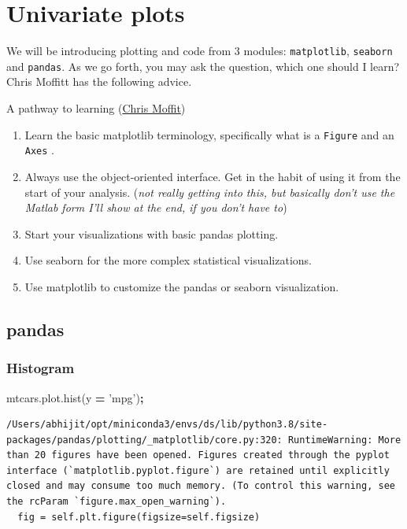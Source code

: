 \documentclass[
  letterpaper,
]{scrbook}
\newenvironment{Shaded}{\begin{snugshade}}{\end{snugshade}}
\newcommand{\NormalTok}[1]{#1}
\newcommand{\OperatorTok}[1]{\textcolor[rgb]{0.81,0.36,0.00}{\textbf{#1}}}
\newcommand{\StringTok}[1]{\textcolor[rgb]{0.31,0.60,0.02}{#1}}
\providecommand{\tightlist}{%
  \setlength{\itemsep}{0pt}\setlength{\parskip}{0pt}}
\begin{document}
\hypertarget{univariate-plots}{%
\section{Univariate plots}\label{univariate-plots}}

We will be introducing plotting and code from 3 modules: \texttt{matplotlib}, \texttt{seaborn} and \texttt{pandas}. As we go forth, you may ask the question, which one should I learn? Chris Moffitt has the following advice.

A pathway to learning (\href{https://pbpython.com/effective-matplotlib.html}{Chris Moffit})

\begin{enumerate}
\def\labelenumi{\arabic{enumi}.}
\tightlist
\item
  Learn the basic matplotlib terminology, specifically what is a \texttt{Figure} and an \texttt{Axes} .
\item
  Always use the object-oriented interface. Get in the habit of using it from the start of your analysis. (\emph{not really getting into this, but basically don't use the Matlab form I'll show at the end, if you don't have to})
\item
  Start your visualizations with basic pandas plotting.
\item
  Use seaborn for the more complex statistical visualizations.
\item
  Use matplotlib to customize the pandas or seaborn visualization.
\end{enumerate}

\hypertarget{pandas}{%
\subsection{pandas}\label{pandas}}

\hypertarget{histogram}{%
\subsubsection{Histogram}\label{histogram}}

\begin{Shaded}
\begin{Highlighting}[]
\NormalTok{mtcars.plot.hist(y }\OperatorTok{=} \StringTok{'mpg'}\NormalTok{)}\OperatorTok{;}
\end{Highlighting}
\end{Shaded}

\begin{verbatim}
/Users/abhijit/opt/miniconda3/envs/ds/lib/python3.8/site-packages/pandas/plotting/_matplotlib/core.py:320: RuntimeWarning: More than 20 figures have been opened. Figures created through the pyplot interface (`matplotlib.pyplot.figure`) are retained until explicitly closed and may consume too much memory. (To control this warning, see the rcParam `figure.max_open_warning`).
  fig = self.plt.figure(figsize=self.figsize)
\end{verbatim}
\end{document}
